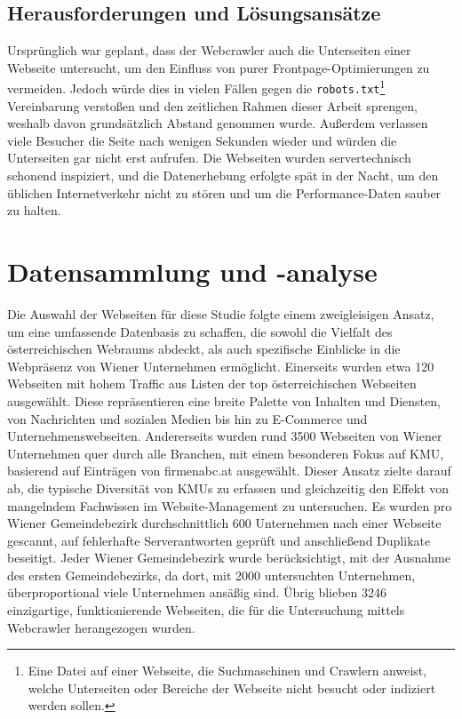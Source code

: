 \documentclass[Bachelor,BIF,german,IEEE]{BASE/twbook}
\begin{document}
\subsection{Herausforderungen und Lösungsansätze}
\noindent Ursprünglich war geplant, dass der Webcrawler auch die Unterseiten einer Webseite untersucht, um den Einfluss von purer Frontpage-Optimierungen zu vermeiden. Jedoch würde dies in vielen Fällen gegen die \texttt{robots.txt}\footnote{Eine Datei auf einer Webseite, die Suchmaschinen und Crawlern anweist, welche Unterseiten oder Bereiche der Webseite nicht besucht oder indiziert werden sollen.} Vereinbarung verstoßen und den zeitlichen Rahmen dieser Arbeit sprengen, weshalb davon grundsätzlich Abstand genommen wurde. Außerdem verlassen viele Besucher die Seite nach wenigen Sekunden wieder und würden die Unterseiten gar nicht erst aufrufen.
Die Webseiten wurden servertechnisch schonend inspiziert, und die Datenerhebung erfolgte spät in der Nacht, um den üblichen Internetverkehr nicht zu stören und um die Performance-Daten sauber zu halten.

\section{Datensammlung und -analyse}
Die Auswahl der Webseiten für diese Studie folgte einem zweigleisigen Ansatz, um eine umfassende Datenbasis zu schaffen, die sowohl die Vielfalt des österreichischen Webraums abdeckt, als auch spezifische Einblicke in die Webpräsenz von Wiener Unternehmen ermöglicht. Einerseits wurden etwa 120 Webseiten mit hohem Traffic aus Listen der \glqq top österreichischen Webseiten\grqq{} ausgewählt. Diese repräsentieren eine breite Palette von Inhalten und Diensten, von Nachrichten und sozialen Medien bis hin zu E-Commerce und Unternehmenswebseiten. Andererseits wurden rund 3500 Webseiten von Wiener Unternehmen quer durch alle Branchen, mit einem besonderen Fokus auf \ac{KMU}, basierend auf Einträgen von firmenabc.at ausgewählt. Dieser Ansatz zielte darauf ab, die typische Diversität von \ac{KMU}s zu erfassen und gleichzeitig den Effekt von mangelndem Fachwissen im Website-Management zu untersuchen. Es wurden pro Wiener Gemeindebezirk durchschnittlich 600 Unternehmen nach einer Webseite gescannt, auf fehlerhafte Serverantworten geprüft und anschließend Duplikate beseitigt. Jeder Wiener Gemeindebezirk wurde berücksichtigt, mit der Ausnahme des ersten Gemeindebezirks, da dort, mit 2000 untersuchten
Unternehmen, überproportional viele Unternehmen ansäßig sind. Übrig blieben 3246 einzigartige, funktionierende Webseiten, die für die Untersuchung mittels Webcrawler herangezogen wurden.\newline
\end{document}
